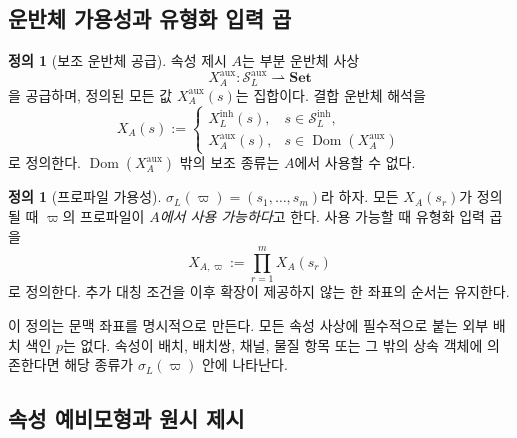 \documentclass[11pt]{article}
\newcommand{\Sin}{\mathcal S_{L}^{\mathrm{inh}}}
\newcommand{\Saux}{\mathcal S_{L}^{\mathrm{aux}}}
\newcommand{\Dom}{\operatorname{Dom}}
\theoremstyle{definition}
\newtheorem{definition}[theorem]{정의}
\theoremstyle{remark}
\begin{document}
\subsection{운반체 가용성과 유형화 입력 곱}

\begin{definition}[보조 운반체 공급]
속성 제시 \(A\)는 부분 운반체 사상
\[
X_A^{\mathrm{aux}}:\Saux\rightharpoonup \mathbf{Set}
\]
을 공급하며, 정의된 모든 값 \(X_A^{\mathrm{aux}}(s)\)는 집합이다.
결합 운반체 해석을
\[
X_A(s):=
\begin{cases}
X_L^{\mathrm{inh}}(s), & s\in\Sin,\\
X_A^{\mathrm{aux}}(s), & s\in\Dom(X_A^{\mathrm{aux}})
\end{cases}
\]
로 정의한다.
\(\Dom(X_A^{\mathrm{aux}})\) 밖의 보조 종류는 \(A\)에서 사용할 수 없다.
\end{definition}

\begin{definition}[프로파일 가용성]
\(\sigma_L(\varpi)=(s_1,\ldots,s_m)\)라 하자.
모든 \(X_A(s_r)\)가 정의될 때 \(\varpi\)의 프로파일이 \emph{\(A\)에서 사용 가능하다}고 한다.
사용 가능할 때 유형화 입력 곱을
\[
X_{A,\varpi}:=\prod_{r=1}^{m}X_A(s_r)
\]
로 정의한다.
추가 대칭 조건을 이후 확장이 제공하지 않는 한 좌표의 순서는 유지한다.
\end{definition}

이 정의는 문맥 좌표를 명시적으로 만든다.
모든 속성 사상에 필수적으로 붙는 외부 배치 색인 \(p\)는 없다.
속성이 배치, 배치쌍, 채널, 물질 항목 또는 그 밖의 상속 객체에 의존한다면 해당 종류가 \(\sigma_L(\varpi)\) 안에 나타난다.

\subsection{속성 예비모형과 원시 제시}
\end{document}
